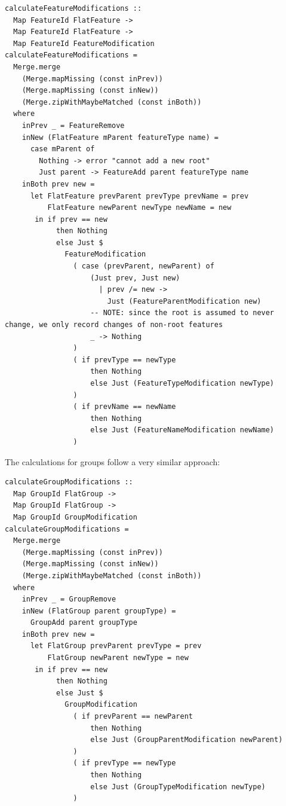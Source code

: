 \documentclass[a4paper,english]{ifimaster}
\begin{document}
\begin{verbatim}
calculateFeatureModifications ::
  Map FeatureId FlatFeature ->
  Map FeatureId FlatFeature ->
  Map FeatureId FeatureModification
calculateFeatureModifications =
  Merge.merge
    (Merge.mapMissing (const inPrev))
    (Merge.mapMissing (const inNew))
    (Merge.zipWithMaybeMatched (const inBoth))
  where
    inPrev _ = FeatureRemove
    inNew (FlatFeature mParent featureType name) =
      case mParent of
        Nothing -> error "cannot add a new root"
        Just parent -> FeatureAdd parent featureType name
    inBoth prev new =
      let FlatFeature prevParent prevType prevName = prev
          FlatFeature newParent newType newName = new
       in if prev == new
            then Nothing
            else Just $
              FeatureModification
                ( case (prevParent, newParent) of
                    (Just prev, Just new)
                      | prev /= new ->
                        Just (FeatureParentModification new)
                    -- NOTE: since the root is assumed to never change, we only record changes of non-root features
                    _ -> Nothing
                )
                ( if prevType == newType
                    then Nothing
                    else Just (FeatureTypeModification newType)
                )
                ( if prevName == newName
                    then Nothing
                    else Just (FeatureNameModification newName)
                )
\end{verbatim}

The calculations for groups follow a very similar approach:

\begin{verbatim}
calculateGroupModifications ::
  Map GroupId FlatGroup ->
  Map GroupId FlatGroup ->
  Map GroupId GroupModification
calculateGroupModifications =
  Merge.merge
    (Merge.mapMissing (const inPrev))
    (Merge.mapMissing (const inNew))
    (Merge.zipWithMaybeMatched (const inBoth))
  where
    inPrev _ = GroupRemove
    inNew (FlatGroup parent groupType) =
      GroupAdd parent groupType
    inBoth prev new =
      let FlatGroup prevParent prevType = prev
          FlatGroup newParent newType = new
       in if prev == new
            then Nothing
            else Just $
              GroupModification
                ( if prevParent == newParent
                    then Nothing
                    else Just (GroupParentModification newParent)
                )
                ( if prevType == newType
                    then Nothing
                    else Just (GroupTypeModification newType)
                )
\end{verbatim}
\end{document}
